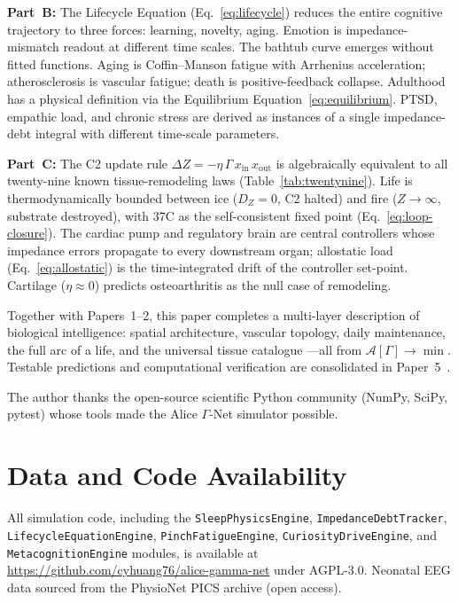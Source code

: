 \documentclass[aps,pre,twocolumn,superscriptaddress,floatfix]{revtex4-2}
\begin{document}
\textbf{Part~B:}
The Lifecycle Equation
(Eq.~\eqref{eq:lifecycle})
reduces the entire cognitive trajectory to three forces:
learning, novelty, aging.
Emotion is impedance-mismatch readout at different time scales.
The bathtub curve emerges without fitted functions.
Aging is Coffin--Manson fatigue with Arrhenius acceleration;
atherosclerosis is vascular fatigue;
death is positive-feedback collapse.
Adulthood has a physical definition via the
Equilibrium Equation~\eqref{eq:equilibrium}.
PTSD, empathic load, and chronic stress are derived as
instances of a single impedance-debt integral with
different time-scale parameters.

\textbf{Part~C:}
The C2 update rule
$\Delta Z = -\eta\,\Gamma\,x_{\text{in}}\,x_{\text{out}}$
is algebraically equivalent to all twenty-nine known
tissue-remodeling laws
(Table~\ref{tab:twentynine}).
Life is thermodynamically bounded between
ice ($D_Z = 0$, C2 halted) and fire ($Z \to \infty$,
substrate destroyed), with 37\textdegree C as the
self-consistent fixed point
(Eq.~\eqref{eq:loop-closure}).
The cardiac pump and regulatory brain are central
controllers whose impedance errors propagate to every
downstream organ; allostatic load
(Eq.~\eqref{eq:allostatic})
is the time-integrated drift of the controller set-point.
Cartilage ($\eta \approx 0$) predicts
osteoarthritis as the null case of remodeling.

Together with Papers~1--2, this paper completes a
multi-layer description of biological intelligence:
spatial architecture, vascular topology,
daily maintenance, the full arc of a life,
and the universal tissue catalogue
---all from $\mathcal{A}[\Gamma] \to \min$.
Testable predictions and computational verification
are consolidated in Paper~5~\cite{Paper5}.


\begin{acknowledgments}
The author thanks the open-source scientific Python community
(NumPy, SciPy, pytest) whose tools made the Alice $\Gamma$-Net
simulator possible.
\end{acknowledgments}

\section*{Data and Code Availability}
All simulation code, including the
\texttt{SleepPhysicsEngine},
\texttt{ImpedanceDebtTracker},
\texttt{LifecycleEquationEngine},
\texttt{PinchFatigueEngine},
\texttt{CuriosityDriveEngine},
and \texttt{MetacognitionEngine}
modules, is available at
\url{https://github.com/cyhuang76/alice-gamma-net}
under AGPL-3.0.
Neonatal EEG data sourced from the PhysioNet PICS archive
(open access).
\end{document}
